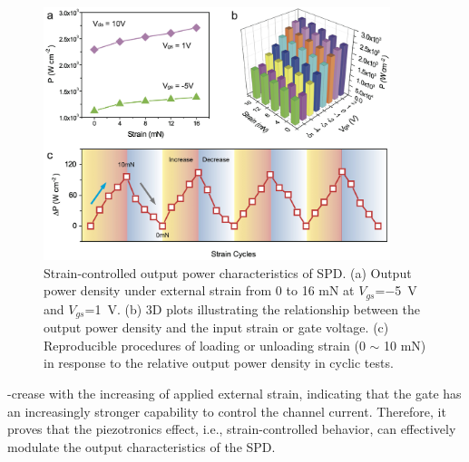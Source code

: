 \begin{figure}[H] 
\centering    
\includegraphics[width=0.9\textwidth]{ch3_modulation1}
\caption[Strain-controlled output power characteristics of SPD]{Strain-controlled output power characteristics of SPD. (a) Output power density under external strain from 0 to 16 \unit{\mN} at $V_{gs}$=\SI{-5}{\volt} and $V_{gs}$=\SI{1}{\volt}. (b) 3D plots illustrating the relationship between the output power density and the input strain or gate voltage. (c) Reproducible procedures of loading or unloading strain (0 $\sim$ 10 \unit{\mN}) in response to the relative output power density in cyclic tests.}
\label{fig3:modulation1}
\end{figure}

\noindent -crease with the increasing of applied external strain, indicating that the gate has an increasingly stronger capability to control the channel  current. Therefore, it proves that the piezotronics  effect, i.e., strain-controlled behavior, can effectively modulate the output characteristics of the SPD.

